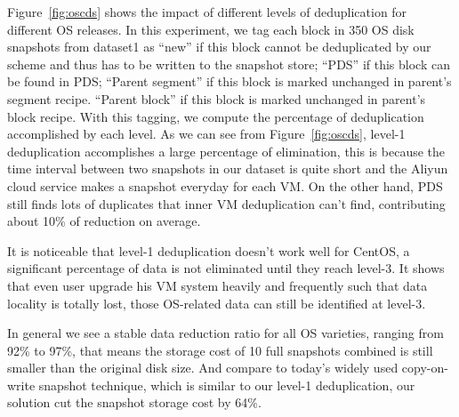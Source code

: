 Figure~\ref{fig:oscds} shows the impact of different levels of deduplication for different OS releases.
In this experiment, we tag each block in 350 OS disk snapshots from dataset1 as  ``new''
if this block cannot be deduplicated by our scheme and thus has to be written to the snapshot store;
``PDS''  if this block can be found  in PDS;
``Parent segment'' if  this block is marked unchanged in parent's segment recipe.
``Parent block'' if  this block is marked unchanged in parent's block recipe.
With this tagging, we compute the percentage of deduplication accomplished by each level.
As we can see from Figure~\ref{fig:oscds}, level-1 deduplication accomplishes a large percentage of elimination,
this is because the time interval between two snapshots in our dataset
is quite short and the Aliyun cloud service makes a snapshot  everyday  for each VM.
On the other hand,  PDS still finds lots of duplicates that inner VM deduplication can't find,
contributing about 10\% of reduction on average.

It is noticeable that level-1 deduplication doesn't work well for CentOS, a significant percentage of data is not
eliminated until they reach level-3. It shows that even user upgrade his VM system heavily and frequently
such that data locality is totally lost, those OS-related data can still be identified at level-3.

In general we see a stable data reduction ratio for all OS varieties, ranging from 92\% to 97\%, that means
the storage cost of 10 full snapshots combined is still smaller than the original disk size. And compare to
today's widely used copy-on-write snapshot technique, which is similar to our level-1 deduplication, our
solution cut the snapshot storage cost by 64\%.




